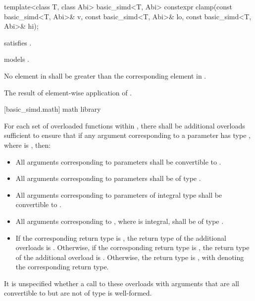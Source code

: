 \begin{itemdecl}
template<class T, class Abi> basic_simd<T, Abi>
  constexpr clamp(const basic_simd<T, Abi>& v, const basic_simd<T, Abi>& lo, const basic_simd<T, Abi>& hi);
\end{itemdecl}

\begin{itemdescr}
  \pnum\constraints
   satisfies .

  \pnum\expects
   models .

  \pnum\expects
  No element in  shall be greater than the corresponding element in .

  \pnum\returns
  The result of element-wise application of  \foralli.
\end{itemdescr}

[basic_simd.math]{ math library}

\pnum
For each set of overloaded functions within , there shall be additional overloads sufficient to ensure that if any argument corresponding to a  parameter has type , where  is , then:
\begin{itemize}
  \item All arguments corresponding to  parameters shall be convertible to .
  \item All arguments corresponding to  parameters shall be of type .
  \item All arguments corresponding to parameters of integral type  shall be convertible to .
  \item All arguments corresponding to , where  is integral, shall be of type .
  \item If the corresponding return type is , the return type of the additional overloads is . Otherwise, if the corresponding return type is , the return type of the additional overload is . Otherwise, the return type is , with  denoting the corresponding return type.
\end{itemize}
It is unspecified whether a call to these overloads with arguments that are all convertible to  but are not of type  is well-formed.

